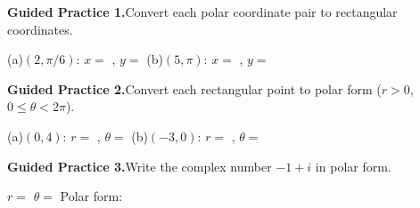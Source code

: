 \documentclass[10pt]{article}
\begin{document}
\begin{practicebox}

\textbf{Guided Practice 1.}\quad Convert each polar coordinate pair to
rectangular coordinates.

\vspace{4pt}
(a)\quad $(2, \pi/6)$: $x = $ , $y = $  \hfill
(b)\quad $(5, \pi)$: $x = $ , $y = $ 

\vspace{0.10in}
\textbf{Guided Practice 2.}\quad Convert each rectangular point to polar form
($r > 0$, $0 \le \theta < 2\pi$).

\vspace{4pt}
(a)\quad $(0, 4)$: $r = $ , $\theta = $  \hfill
(b)\quad $(-3, 0)$: $r = $ , $\theta = $ \ans{$\pi$}

\vspace{0.10in}
\textbf{Guided Practice 3.}\quad Write the complex number $-1 + i$ in polar form.

\vspace{4pt}
$r = $  \quad $\theta = $  \quad
Polar form: 

\end{practicebox}
\end{document}
